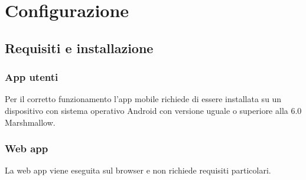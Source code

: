 \section{Configurazione}
\subsection{Requisiti e installazione}
\subsubsection{App utenti}
Per il corretto funzionamento l'app mobile richiede di essere installata su un dispositivo con sistema operativo Android con versione uguale o superiore alla 6.0 Marshmallow.
\subsubsection{Web app}
La web app viene eseguita sul browser e non richiede requisiti particolari.